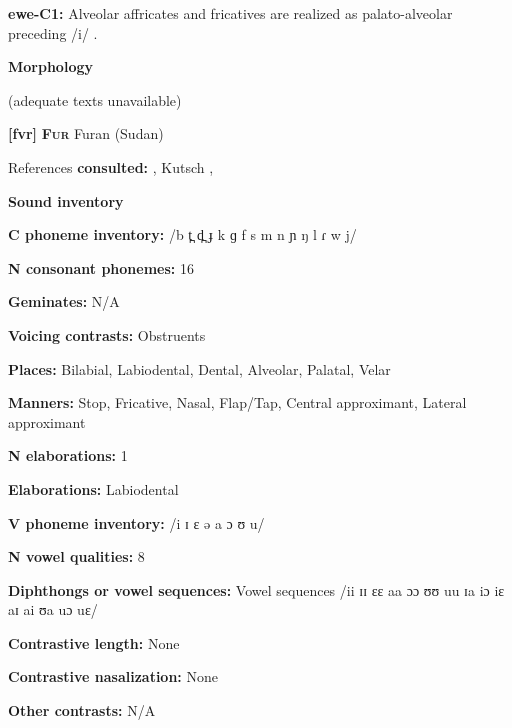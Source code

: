 \textbf{ewe-C1:} Alveolar affricates and fricatives are realized as palato-alveolar preceding /i/ \citep[9]{Jalloh2005}.



\textbf{Morphology}



(adequate texts unavailable)



\textbf{[fvr]}   \textbf{\textsc{Fur}}  Furan (Sudan)



References \textbf{consulted:} \citet{Jakobi1990}, Kutsch \citet{LojengaWaag2004}, \citet{Noel2008}



\textbf{Sound inventory}



\textbf{C phoneme inventory:} /b t̪ d̪ ɟ k ɡ f s m n ɲ ŋ l ɾ w j/



\textbf{N consonant phonemes:} 16



\textbf{Geminates:} N/A



\textbf{Voicing contrasts:} Obstruents



\textbf{Places:} Bilabial, Labiodental, Dental, Alveolar, Palatal, Velar



\textbf{Manners:} Stop, Fricative, Nasal, Flap/Tap, Central approximant, Lateral approximant



\textbf{N elaborations:} 1



\textbf{Elaborations:} Labiodental



\textbf{V phoneme inventory:} /i ɪ ɛ ə a ɔ ʊ u/



\textbf{N vowel qualities:} 8



\textbf{Diphthongs or vowel sequences:} Vowel sequences /ii ɪɪ ɛɛ aa ɔɔ ʊʊ uu ɪa iɔ iɛ aɪ ai ʊa uɔ uɛ/



\textbf{Contrastive length:} None



\textbf{Contrastive nasalization:} None



\textbf{Other contrasts:} N/A



